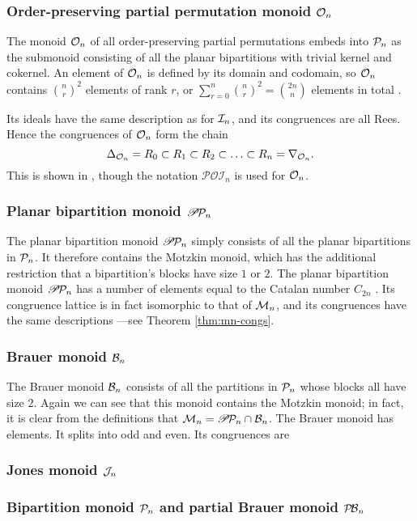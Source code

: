\subsubsection{Order-preserving partial permutation monoid $\mathcal{O}_n$}
 The
monoid $\mathcal{O}_n$ of all order-preserving partial permutations embeds into $\mathcal{P}_n$
as the submonoid consisting of all the planar bipartitions with trivial kernel
and cokernel.  An element of $\mathcal{O}_n$ is defined by its domain and codomain, so
$\mathcal{O}_n$ contains $\binom{n}{r}^2$ elements of rank $r$, or
$\sum_{r=0}^n \binom{n}{r}^2 = \binom{2n}{n}$ elements in total
.

Its ideals have the same description as for $\mathcal{I}_n$, and
its congruences are all Rees.  Hence the congruences of $\mathcal{O}_n$ form the chain
$$\Delta_{\mathcal{O}_n} = R_0 \subset R_1 \subset R_2 \subset \ldots
\subset R_n = \nabla_{\mathcal{O}_n}.$$
This is shown in \cite[Proposition 2.6]{fernandes_2001}, though the notation
$\mathcal{POI}_n$ is used for $\mathcal{O}_n$.

\subsubsection{Planar bipartition monoid $\mathscr{P}\!\mathcal{P}_n$}
The planar bipartition monoid $\mathscr{P}\!\mathcal{P}_n$ simply consists of all the planar
bipartitions in $\mathcal{P}_n$.  It therefore contains the Motzkin monoid, which has
the additional restriction that a bipartition's blocks have size $1$ or $2$.
The planar bipartition monoid $\mathscr{P}\!\mathcal{P}_n$ has a number of elements equal to the
Catalan number $C_{2n}$ .  Its congruence lattice is in fact
isomorphic to that of $\mathcal{M}_n$, and its congruences have the same
descriptions \cite[\S7]{ourpaper}---see Theorem \ref{thm:mn-congs}.

\subsubsection{Brauer monoid $\mathcal{B}_n$}
The Brauer monoid $\mathcal{B}_n$ consists of all the partitions in $\mathcal{P}_n$ whose
blocks all have size $2$.  Again we can see that this monoid contains the
Motzkin monoid; in fact, it is clear from the definitions that
$\mathcal{M}_n = \mathscr{P}\!\mathcal{P}_n \cap \mathcal{B}_n$.
The Brauer monoid has $ $ elements.
It splits into odd and even.
Its congruences are
\cite[\S8]{ourpaper}

\subsubsection{Jones monoid $\mathcal{J}_n$}
\cite[\S9]{ourpaper}

\subsubsection{Bipartition monoid $\mathcal{P}_n$ and partial Brauer monoid $\mathcal{P\!B}_n$}
\cite[\S5--6]{ourpaper}

